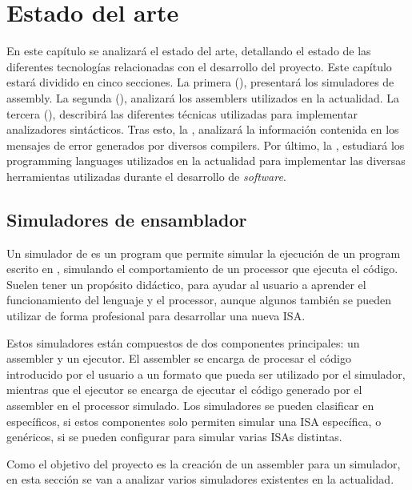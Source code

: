 \chapter{Estado del arte}\label{chap:state-of-the-art}

En este capítulo se analizará el estado del arte, detallando el estado de las
diferentes tecnologías relacionadas con el desarrollo del proyecto. Este
capítulo estará dividido en cinco secciones. La primera
(), presentará los simuladores de \gls{assembly}. La
segunda (), analizará los \glspl{assembler} utilizados en
la actualidad. La tercera (), describirá las
diferentes técnicas utilizadas para implementar analizadores sintácticos. Tras
esto, la , analizará la información contenida en los
mensajes de error generados por diversos \glspl{compiler}. Por último, la
, estudiará los \glspl{programming language}
utilizados en la actualidad para implementar las diversas herramientas
utilizadas durante el desarrollo de \textit{software}.

\section{Simuladores de ensamblador}\label{sec:simulators}

Un simulador de  es un \gls{program} que permite
simular la ejecución de un \gls{program} escrito en ,
simulando el comportamiento de un \gls{processor} que ejecuta el código. Suelen
tener un propósito didáctico, para ayudar al usuario a aprender el
funcionamiento del lenguaje y el \gls{processor}, aunque algunos también se
pueden utilizar de forma profesional para desarrollar una nueva \gls{ISA}.

Estos simuladores están compuestos de dos componentes principales: un
\gls{assembler} y un ejecutor. El \gls{assembler} se encarga de procesar el
código  introducido por el usuario a un formato
que pueda ser utilizado por el simulador, mientras que el ejecutor se encarga
de ejecutar el código generado por el \gls{assembler} en el \gls{processor}
simulado. Los simuladores se pueden clasificar en específicos, si estos componentes
solo permiten simular una \gls{ISA} específica, o genéricos, si se pueden
configurar para simular varias \glspl{ISA} distintas.

Como el objetivo del proyecto es la creación de un \gls{assembler} para un
simulador, en esta sección se van a analizar varios simuladores existentes en la
actualidad.


